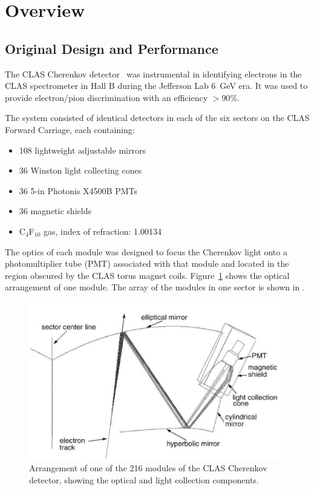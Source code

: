 \section{Overview}

\subsection{Original Design and Performance}

The CLAS Cherenkov detector~\cite{Adams:2001kk} was instrumental in identifying electrons in the CLAS
spectrometer in Hall B during the Jefferson Lab 6~GeV era. It was used to provide electron/pion discrimination
with an efficiency $> 90\%$.

The system consisted of identical detectors in each of the six sectors on the CLAS Forward Carriage, each
containing:

\begin{itemize}
	\item 108 lightweight adjustable mirrors
	\item 36 Winston light collecting cones
	\item 36 5-in Photonis X4500B PMTs
	\item 36 magnetic shields
	\item C$_4$F$_{10}$ gas, index of refraction: 1.00134
\end{itemize}

The optics of each module was designed to focus the Cherenkov light onto a photomultiplier tube (PMT) associated
with that module and located in the region obscured by the CLAS torus magnet coils. Figure~\ref{fig:optics} shows
the optical arrangement of one module. The array of the modules in one sector is shown in .

\begin{figure}[ht]
	\centering
	\includegraphics[width=1.0\columnwidth,keepaspectratio]{img/optics.png}
	\caption{Arrangement of one of the 216 modules of the CLAS Cherenkov detector, showing the optical and
          light collection components.}
	\label{fig:optics}
\end{figure}

